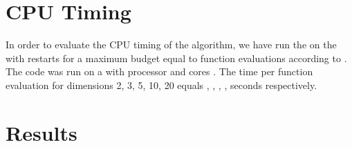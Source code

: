 \documentclass[sigconf]{acmart}
\begin{document}




\maketitle


%
%
%
\section{CPU Timing}
In order to evaluate the CPU timing of the algorithm, we have run the  on the   with restarts for a maximum budget equal to  function evaluations according to \cite{hansen2016exp}. The  code was run on a  with  processor and  cores . The time per function evaluation for dimensions 2, 3, 5, 10, 20 equals , , , ,  seconds respectively. 


\section{Results}
\end{document}
